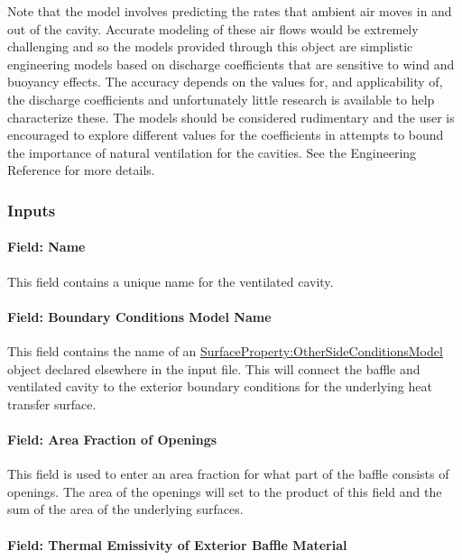 Note that the model involves predicting the rates that ambient air moves in and out of the cavity. Accurate modeling of these air flows would be extremely challenging and so the models provided through this object are simplistic engineering models based on discharge coefficients that are sensitive to wind and buoyancy effects. The accuracy depends on the values for, and applicability of, the discharge coefficients and unfortunately little research is available to help characterize these. The models should be considered rudimentary and the user is encouraged to explore different values for the coefficients in attempts to bound the importance of natural ventilation for the cavities. See the Engineering Reference for more details.

\subsubsection{Inputs}\label{inputs-13}

\paragraph{Field: Name}\label{field-name-9}

This field contains a unique name for the ventilated cavity.

\paragraph{Field: Boundary Conditions Model Name}\label{field-boundary-conditions-model-name}

This field contains the name of an \hyperref[surfacepropertyothersideconditionsmodel]{SurfaceProperty:OtherSideConditionsModel} object declared elsewhere in the input file. This will connect the baffle and ventilated cavity to the exterior boundary conditions for the underlying heat transfer surface.

\paragraph{Field: Area Fraction of Openings}\label{field-area-fraction-of-openings}

This field is used to enter an area fraction for what part of the baffle consists of openings. The area of the openings will set to the product of this field and the sum of the area of the underlying surfaces.

\paragraph{Field: Thermal Emissivity of Exterior Baffle Material}\label{field-thermal-emissivity-of-exterior-baffle-material}

